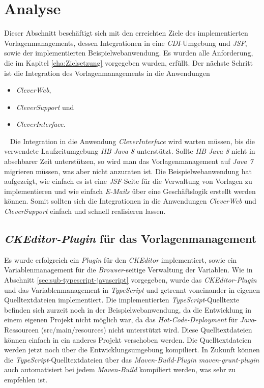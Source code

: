 \section{Analyse}
Dieser Abschnitt beschäftigt sich mit den erreichten Ziele des implementierten Vorlagenmanagements, dessen Integrationen in eine \emph{CDI}-Umgebung und \emph{JSF}, sowie der implementierten Beispielwebanwendung. Es wurden alle Anforderung, die im Kapitel \ref{cha:Zielsetzung} vorgegeben wurden, erfüllt. Der nächste Schritt ist die Integration des Vorlagenmanagements in die Anwendungen
\begin{itemize}
	\item\emph{CleverWeb},
	\item\emph{CleverSupport} und
	\item\emph{CleverInterface}.
\end{itemize}
\ \newline
Die Integration in die Anwendung \emph{CleverInterface} wird warten müssen, bis die verwendete Laufzeitumgebung \emph{IIB Java 8} unterstützt. Sollte \emph{IIB Java 8} nicht in absehbarer Zeit unterstützen, so wird man das Vorlagenmanagement auf \emph{Java 7} migrieren müssen, was aber nicht anzuraten ist. Die Beispielwebanwendung hat aufgezeigt, wie einfach es ist eine \emph{JSF}-Seite für die Verwaltung von Vorlagen zu implementieren und wie einfach \emph{E-Mails} über eine Geschäftslogik erstellt werden können. Somit sollten sich die Integrationen in die Anwendungen \emph{CleverWeb} und \emph{CleverSupport} einfach und schnell realisieren lassen. 

\subsection{\emph{CKEditor-Plugin} für das Vorlagenmanagement}
Es wurde erfolgreich ein \emph{Plugin} für den \emph{CKEditor} implementiert, sowie ein Variablenmanagement für die \emph{Browser}-seitige Verwaltung der Variablen. Wie in Abschnitt \ref{sec:sub-typescript-javascript} vorgegeben, wurde das \emph{CKEditor-Plugin} und das Variablenmanagement in \emph{TypeScript} und getrennt voneinander in eigenen Quelltextdateien implementiert. Die implementierten \emph{TypeScript}-Quelltexte befinden sich zurzeit noch in der Beispielwebanwendung, da die Entwicklung in einem eigenen Projekt nicht möglich war, da das \emph{Hot-Code-Deployment} für \emph{Java}-Ressourcen (src/main/resources) nicht unterstützt wird. Diese Quelltextdateien können einfach in ein anderes Projekt verschoben werden. Die Quelltextdateien werden jetzt noch über die Entwicklungsumgebung kompiliert. In Zukunft können die \emph{TypeScript}-Quelltextdateien über das \emph{Maven-Build-Plugin maven-grunt-plugin} auch automatisiert bei jedem \emph{Maven-Build} kompiliert werden, was sehr zu empfehlen ist.

